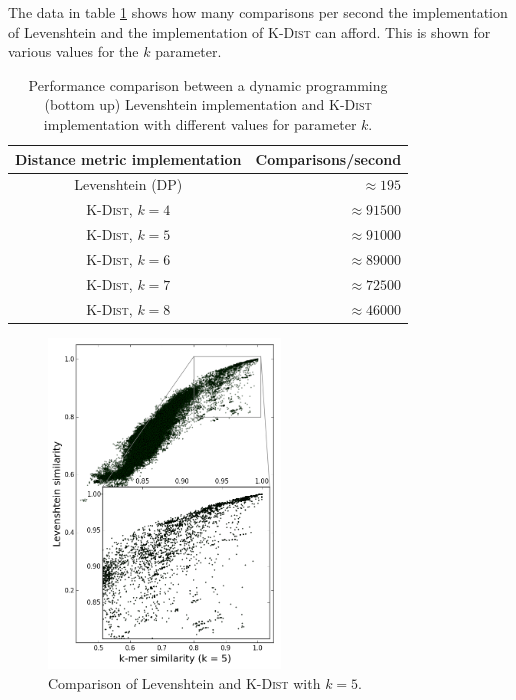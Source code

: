 The data in table \ref{tab:levenshtein_vs_kdist_performance} shows how many
comparisons per second the implementation of Levenshtein and the implementation
of \textsc{K-Dist} can afford. This is shown for various values for the $k$
parameter.

\begin{table}[H] %
  \centering
  \begin{tabular}{ c | r }
    Distance metric implementation  & Comparisons/second    \\
    \hline \hline
    Levenshtein (DP)                & $\approx \num{195}$   \\ \hline
    \textsc{K-Dist}, $k=4$          & $\approx \num{91500}$ \\ \hline
    \textsc{K-Dist}, $k=5$          & $\approx \num{91000}$ \\ \hline
    \textsc{K-Dist}, $k=6$          & $\approx \num{89000}$ \\ \hline
    \textsc{K-Dist}, $k=7$          & $\approx \num{72500}$ \\ \hline
    \textsc{K-Dist}, $k=8$          & $\approx \num{46000}$ \\
  \end{tabular}
  \caption{Performance comparison between a dynamic programming (bottom up)
    Levenshtein implementation and \textsc{K-Dist} implementation with
    different values for parameter $k$.}
  \label{tab:levenshtein_vs_kdist_performance}
\end{table}

\begin{figure}
  \includegraphics[width=0.55\textwidth]{graphics/Levenshtein_K-Dist_k5.png}
  \caption{Comparison of Levenshtein and \textsc{K-Dist} with $k=5$.}
\end{figure}

